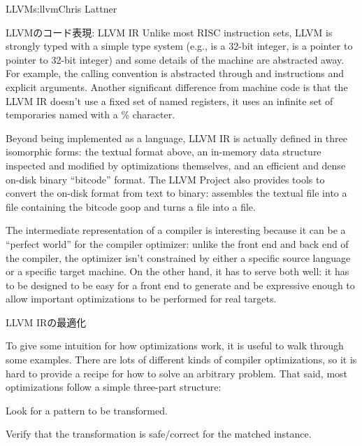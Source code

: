 \begin{aosachapter}{LLVM}{s:llvm}{Chris Lattner}
\begin{aosasect1}{LLVMのコード表現: LLVM IR}
Unlike most RISC instruction sets, LLVM is strongly typed with a
simple type system (e.g.,  is a 32-bit integer, 
is a pointer to pointer to 32-bit integer) and some details of the
machine are abstracted away.  For example, the calling convention is
abstracted through  and  instructions and
explicit arguments.  Another significant difference from machine code
is that the LLVM IR doesn't use a fixed set of named registers, it
uses an infinite set of temporaries named with a \% character.

Beyond being implemented as a language, LLVM IR is actually defined in
three isomorphic forms: the textual format above, an in-memory data
structure inspected and modified by optimizations themselves, and an
efficient and dense on-disk binary ``bitcode'' format.  The LLVM
Project also provides tools to convert the on-disk format from text to
binary:  assembles the textual  file into a
 file containing the bitcode goop and  turns a
 file into a  file.

The intermediate representation of a compiler is interesting because
it can be a ``perfect world'' for the compiler optimizer: unlike the
front end and back end of the compiler, the optimizer isn't constrained
by either a specific source language or a specific target machine.  On
the other hand, it has to serve both well: it has to be designed to be
easy for a front end to generate and be expressive enough to allow
important optimizations to be performed for real targets.

\begin{aosasect2}{LLVM IRの最適化}

To give some intuition for how optimizations work, it is useful to
walk through some examples.  There are lots of different kinds of
compiler optimizations, so it is hard to provide a recipe for how to
solve an arbitrary problem.  That said, most optimizations follow a
simple three-part structure:

\begin{aosaitemize}

  \item Look for a pattern to be transformed.

  \item Verify that the transformation is safe/correct for the matched
  instance.


\end{aosaitemize}
\end{aosasect2}
\end{aosasect1}
\end{aosachapter}
